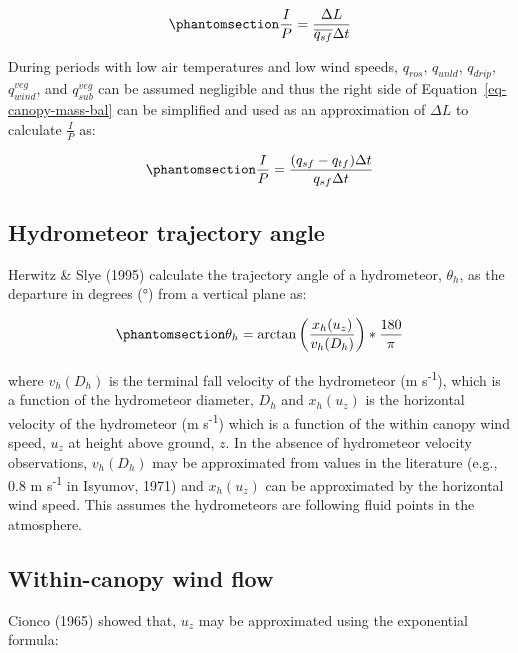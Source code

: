 \documentclass[
  letterpaper,
]{tex/uofsthesis-cs}
\begin{document}
\begin{equation}\phantomsection\label{eq-ip}{
\frac{I}{P} = \frac{\Delta L}{\overline{q_{sf}} \Delta t}
}\end{equation}

During periods with low air temperatures and low wind speeds,
\(q_{ros}\), \(q_{unld}\), \(q_{drip}\), \(q_{wind}^{veg}\), and
\(q_{sub}^{veg}\) can be assumed negligible and thus the right side of
Equation~\ref{eq-canopy-mass-bal} can be simplified and used as an
approximation of \(\Delta L\) to calculate \(\frac{I}{P}\) as:

\begin{equation}\phantomsection\label{eq-ip2}{
\frac{I}{P} = \frac{(q_{sf} - q_{tf})\Delta t}{q_{sf} \Delta t}
}\end{equation}

\subsection{Hydrometeor trajectory
angle}\label{hydrometeor-trajectory-angle}

Herwitz \& Slye (1995) calculate the trajectory angle of a hydrometeor,
\(\theta_h\), as the departure in degrees (°) from a vertical plane as:

\begin{equation}\phantomsection\label{eq-ta}{
\theta_h = \arctan \left(\frac{x_h(u_z)}{v_h(D_h)}\right)*\frac{180}{\pi}
}\end{equation}

where \(v_h(D_h)\) is the terminal fall velocity of the hydrometeor (m
s\textsuperscript{-1}), which is a function of the hydrometeor diameter,
\(D_h\) and \(x_h(u_z)\) is the horizontal velocity of the hydrometeor
(m s\textsuperscript{-1}) which is a function of the within canopy wind
speed, \(u_z\) at height above ground, \(z\). In the absence of
hydrometeor velocity observations, \(v_h(D_h)\) may be approximated from
values in the literature (e.g., 0.8 m s\textsuperscript{-1} in Isyumov,
1971) and \(x_h(u_z)\) can be approximated by the horizontal wind speed.
This assumes the hydrometeors are following fluid points in the
atmosphere.

\subsection{Within-canopy wind flow}\label{within-canopy-wind-flow}

Cionco (1965) showed that, \(u_z\) may be approximated using the
exponential formula:
\end{document}

